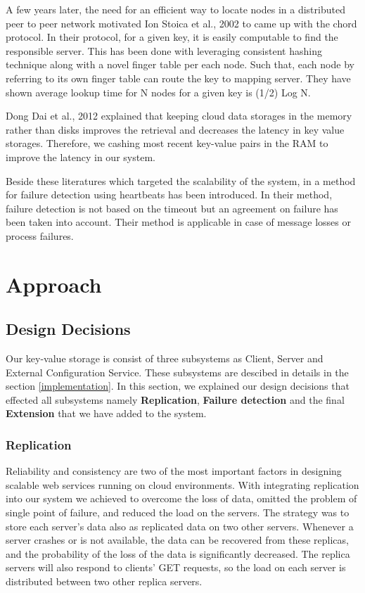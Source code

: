 \documentclass{sig-alternate}
\begin{document}
A few years later, the need for an efficient way to locate nodes in a distributed peer to peer network motivated Ion Stoica et al., 2002 \cite{chord} to came up with the chord protocol. In their protocol, for a given key,   it is easily computable to find the responsible server. This has been done with leveraging consistent hashing technique along with a novel finger table per each node. Such that, each node by referring to its own finger table can route the key to mapping server. They have shown average lookup time for N nodes for a given key is (1/2) Log N. 

Dong Dai et al., 2012 \cite{memory} explained that keeping cloud data storages in the memory rather than disks improves the retrieval and decreases the latency in key value storages. Therefore, we cashing most recent key-value pairs in the RAM to improve the latency in our system.

Beside these literatures which targeted the scalability of the system, in \cite{heartbeat} a method for failure detection using heartbeats has been introduced. In their method, failure detection is not based on the timeout  but an agreement on failure has been taken into account. Their method is applicable in case of message losses or process failures.


\section{Approach}
\subsection{Design Decisions}
Our key-value storage is consist of three subsystems as Client, Server and External Configuration Service. These subsystems are descibed in details in the section \ref{implementation}. In this section, we explained our design decisions that effected all subsystems namely  \textbf{Replication}, \textbf{Failure detection} and the final \textbf{Extension} that we have added to the system. 

\subsubsection{Replication}
Reliability and consistency are two of the most important factors in designing scalable web services running on cloud environments. With integrating replication into our system we achieved to overcome the loss of data, omitted the problem of single point of failure, and reduced the load on the servers. The strategy was to store each server's data also as replicated data on two other servers. Whenever a server crashes or is not available, the data can be recovered from these replicas, and the probability of the loss of the data is  significantly decreased. The replica servers will also respond to clients' GET requests, so the load on each server is distributed between two other replica servers. 
\end{document}
